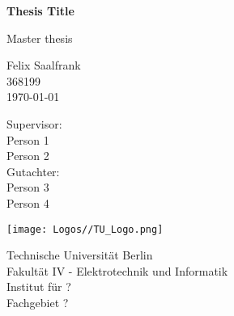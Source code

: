 \begin{titlepage}
	\begin{center} %
		\vspace*{1cm} %
		
		\Huge
		\textbf{Thesis Title}
		
		\vspace{0.5cm}
		Master thesis
		
		\vspace{1.5cm}
		\LARGE{Felix Saalfrank}\\
		\large 368199\\
		\vspace{1cm}
		\today
		
		\vspace{1.5cm}
		
		Supervisor:\\
		Person 1\\
		Person 2\\
		Gutachter:\\
		Person 3\\
		Person 4
		
		\vfill
		
		\vspace{0.8cm}
		
		\texttt{[image: Logos//TU\_Logo.png]}
		
		Technische Universität Berlin\\
		Fakult\"at IV - Elektrotechnik und Informatik\\
		Institut f\"ur ?\\
		Fachgebiet ?\\
		
	\end{center}
\end{titlepage}